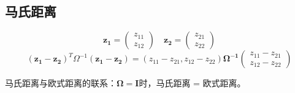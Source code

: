   \subsection{马氏距离}
  \begin{myexample}[马氏距离的定义]
    \[ \boldsymbol{z_1} = 
    \begin{pmatrix}
        z_{11} \\
        z_{12}
    \end{pmatrix} \quad 
    \boldsymbol{z_2} = 
    \begin{pmatrix}
        z_{21} \\
        z_{22}
    \end{pmatrix} \]
    \[
        \boldsymbol{(z_{1} -z_{2})}^{T} \Omega^{-1} \boldsymbol{(z_{1} -z_{2})} = 
        \left( z_{11}- z_{21}, z_{12}- z_{22}\right)  \boldsymbol{\Omega^{-1}} 
        \begin{pmatrix}
            z_{11}- z_{21} \\
            z_{12}- z_{22}
        \end{pmatrix} \]
        
        马氏距离与欧式距离的联系：$ \boldsymbol{\Omega = I} $时，马氏距离 = 欧式距离。
  \end{myexample}
